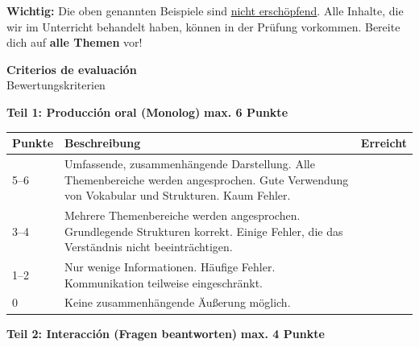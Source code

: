 \documentclass[11pt, a4paper]{article}
\begin{document}
\vspace{8pt}


\begin{warnbox}
\textbf{Wichtig:} Die oben genannten Beispiele sind \underline{nicht erschöpfend}. Alle Inhalte, die wir im Unterricht behandelt haben, können in der Prüfung vorkommen. Bereite dich auf \textbf{alle Themen} vor!
\end{warnbox}

\newpage


\begin{center}
{\Large\bfseries Criterios de evaluación}\\[4pt]
{\normalsize Bewertungskriterien}
\end{center}

\vspace{8pt}

\textbf{\large Teil 1: Producción oral (Monolog)} \hfill \textbf{max. 6 Punkte}

\vspace{4pt}

\begin{tabularx}{\textwidth}{|p{1.2cm}|X|p{1.5cm}|}
\hline
\rowcolor{hellgrau}
\textbf{Punkte} & \textbf{Beschreibung} & \textbf{Erreicht} \\
\hline
5--6 & Umfassende, zusammenhängende Darstellung. Alle Themenbereiche werden angesprochen. Gute Verwendung von Vokabular und Strukturen. Kaum Fehler. & \\
\hline
3--4 & Mehrere Themenbereiche werden angesprochen. Grundlegende Strukturen korrekt. Einige Fehler, die das Verständnis nicht beeinträchtigen. & \\
\hline
1--2 & Nur wenige Informationen. Häufige Fehler. Kommunikation teilweise eingeschränkt. & \\
\hline
0 & Keine zusammenhängende Äußerung möglich. & \\
\hline
\end{tabularx}

\vspace{12pt}

\textbf{\large Teil 2: Interacción (Fragen beantworten)} \hfill \textbf{max. 4 Punkte}
\end{document}
